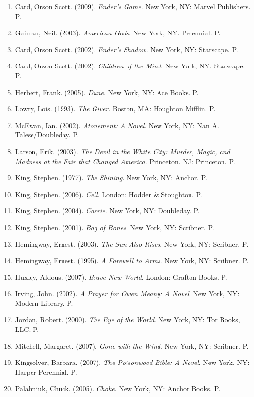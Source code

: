 \documentclass[11pt,a4paper]{article}
\begin{document}
\begin{enumerate}
   \item Card, Orson Scott. (2009). \textit{Ender's Game}. New York, NY: Marvel Publishers. P.
   \item Gaiman, Neil. (2003). \textit{American Gods}. New York, NY: Perennial. P.
   \item Card, Orson Scott. (2002). \textit{Ender's Shadow}. New York, NY: Starscape. P.
   \item Card, Orson Scott. (2002). \textit{Children of the Mind}. New York, NY: Starscape. P.
   \item Herbert, Frank. (2005). \textit{Dune}. New York, NY: Ace Books. P.
   \item Lowry, Lois. (1993). \textit{The Giver}. Boston, MA: Houghton Mifflin. P.
   \item McEwan, Ian. (2002). \textit{Atonement: A Novel}. New York, NY: Nan A. Talese/Doubleday. P.
   \item Larson, Erik. (2003). \textit{The Devil in the White City: Murder, Magic, and Madness at the Fair that Changed America}. Princeton, NJ: Princeton. P.
   \item King, Stephen. (1977). \textit{The Shining}. New York, NY: Anchor. P.
   \item King, Stephen. (2006). \textit{Cell}. London: Hodder \& Stoughton. P.
   \item King, Stephen. (2004). \textit{Carrie}. New York, NY: Doubleday. P.
   \item King, Stephen. (2001). \textit{Bag of Bones}. New York, NY: Scribner. P. 
   \item Hemingway, Ernest. (2003). \textit{The Sun Also Rises}. New York, NY: Scribner. P.
   \item Hemingway, Ernest. (1995). \textit{A Farewell to Arms}. New York, NY: Scribner. P.
   \item Huxley, Aldous. (2007). \textit{Brave New World}. London: Grafton Books. P.
   \item Irving, John. (2002). \textit{A Prayer for Owen Meany: A Novel}. New York, NY: Modern Library. P.
   \item Jordan, Robert. (2000). \textit{The Eye of the World}. New York, NY: Tor Books, LLC. P.
   \item Mitchell, Margaret. (2007). \textit{Gone with the Wind}. New York, NY: Scribner. P.
   \item Kingsolver, Barbara. (2007). \textit{The Poisonwood Bible: A Novel}. New York, NY: Harper Perennial. P.
   \item Palahniuk, Chuck. (2005). \textit{Choke}. New York, NY: Anchor Books. P.

\end{enumerate}
\end{document}
